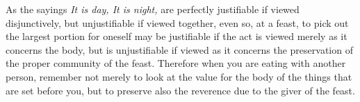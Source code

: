 As the  sayings \emph{It  is day,  It is night,}  are perfectly  justifiable if
viewed  disjunctively, but  unjustifiable if  viewed  together, even  so, at  a
feast, to pick  out the largest portion  for oneself may be  justifiable if the
act is viewed merely as it concerns the body, but is unjustifiable if viewed as
it concerns  the preservation of the  proper community of the  feast. Therefore
when you  are eating with  another person, remember not  merely to look  at the
value for the body of the things that  are set before you, but to preserve also
the reverence due to the giver of the feast.
